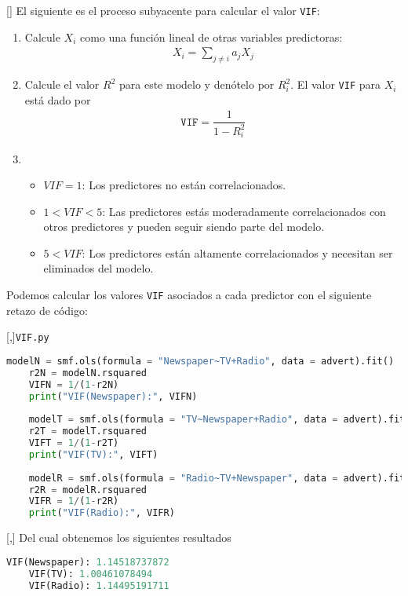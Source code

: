 []{}
El siguiente es el proceso subyacente para calcular el valor \texttt{VIF}:
\begin{enumerate}
	\item Calcule $X_{i}$ como una función lineal de otras variables predictoras:
	\begin{align}
		X_{i}=\sum_{j\neq i}a_{j}X_{j}
	\end{align}
	\item Calcule el valor $R^{2}$ para este modelo y denótelo por $R^{2}_{i}.$ El valor \texttt{VIF} para $X_{i}$ está dado por
	\begin{align}
		\texttt{VIF}= \dfrac{1}{1-R_{i}^{2}}
	\end{align} 
	\item
	\begin{itemize}
		\item $VIF=1$: Los predictores no están correlacionados.
		\item $1<VIF<5$: Las predictores estás moderadamente correlacionados con otros predictores y pueden seguir siendo parte del modelo.
		\item $5<VIF$: Los predictores están altamente correlacionados y necesitan ser eliminados del modelo.
	\end{itemize}
	
\end{enumerate}



Podemos calcular los valores \texttt{VIF} asociados a cada predictor con el siguiente retazo de código:

[,]{\texttt{VIF.py}}
\begin{lstlisting}[language=Python]
	modelN = smf.ols(formula = "Newspaper~TV+Radio", data = advert).fit()
	r2N = modelN.rsquared
	VIFN = 1/(1-r2N)
	print("VIF(Newspaper):", VIFN)
	
	modelT = smf.ols(formula = "TV~Newspaper+Radio", data = advert).fit()
	r2T = modelT.rsquared
	VIFT = 1/(1-r2T)
	print("VIF(TV):", VIFT)
	
	modelR = smf.ols(formula = "Radio~TV+Newspaper", data = advert).fit()
	r2R = modelR.rsquared
	VIFR = 1/(1-r2R)
	print("VIF(Radio):", VIFR)
\end{lstlisting}

[,]{}
Del cual obtenemos los siguientes resultados
\begin{lstlisting}[language=Python]
	VIF(Newspaper): 1.14518737872
	VIF(TV): 1.00461078494
	VIF(Radio): 1.14495191711
\end{lstlisting}


